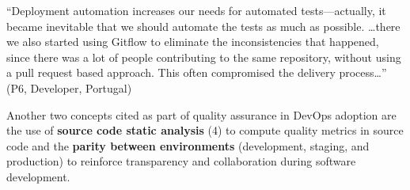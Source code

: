 \begin{mq}
  ``Deployment automation increases our
  needs for automated tests---actually, it became inevitable
  that we should automate the tests as much as possible. \ldots there we
  also started using Gitflow to eliminate the inconsistencies that
  happened, since there was a lot of people contributing
  to the same repository, without using a pull request based approach. 
  This often compromised the delivery process\ldots'' (P6, Developer, Portugal)
\end{mq}

Another two concepts cited as part of quality assurance in DevOps adoption are
the use of \textbf{source code static analysis} (4) to compute quality metrics in
source code and the \textbf{parity between environments} (development, staging,
and production) to reinforce transparency and collaboration during software
development.
